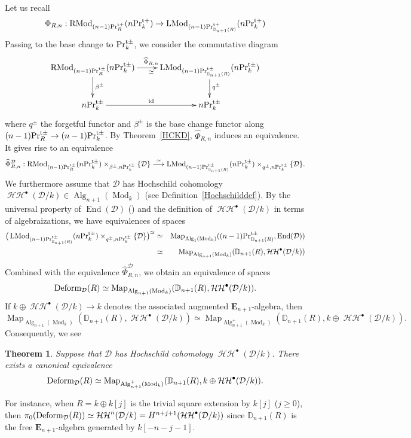 \documentclass[leqno,12pt]{amsart}
\theoremstyle{plain}
\newtheorem{Theorem}{Theorem}[section]
\theoremstyle{definition}
\newcommand{\DD}{\mathbb{D}}
\newcommand{\HH}{\operatorname{\mathcal{HH}}}
\newcommand{\DDD}{\mathcal{D}}
\newcommand{\PRTT}{\textup{Pr}^{\textup{t}+}}
\newcommand{\PRTTT}{\textup{Pr}^{\textup{t}\pm}}
\newcommand{\Mod}{\operatorname{Mod}}
\newcommand{\Map}{\operatorname{Map}}
\newcommand{\Fun}{\operatorname{Fun}}
\newcommand{\Alg}{\operatorname{Alg}}
\newcommand{\End}{\operatorname{End}}
\newcommand{\LMod}{\operatorname{LMod}}
\newcommand{\RMod}{\operatorname{RMod}}
\begin{document}
Let us recall
\[
\Phi_{R,n} :\RMod_{(n-1)\PRTT_R}(n\PRTT_k) \to  \LMod_{(n-1)\PRTT_{\DD_{n+1}(R)}}(n\PRTT_k) %
\]
Passing to the base change to $\PRTTT_k$,
we consider the commutative diagram 
\[
\xymatrix{
\RMod_{(n-1)\PRTTT_R}(n\PRTTT_k)  \ar[r]^{\widehat{\Phi}_{R,n}}_{\simeq} \ar[d]^{\beta^\pm} & \LMod_{(n-1)\PRTTT_{\DD_{n+1}(R)}}(n\PRTTT_k)   \ar[d]^{q^{\pm}} \\
n\PRTTT_k  \ar[r]^{\textup{id}}  & n\PRTTT_k
}
\]
where $q^\pm$ the forgetful functor and $\beta^\pm$ is the base change functor along 
$(n-1)\PRTTT_R \to (n-1)\PRTTT_k$.
By Theorem~\ref{HCKD}, $\widehat{\Phi}_{R,n}$ induces an equivalence.
It gives rise to an equivalence
\[
\widehat{\Phi}_{R,n}^{\DDD}:\RMod_{(n-1)\PRTTT_R}(n\PRTTT_k)\times_{\beta^{\pm},n\PRTTT_k}\{\DDD\}
\stackrel{\simeq}{\longrightarrow}  \LMod_{(n-1)\PRTTT_{\DD_{n+1}(R)}}(n\PRTTT_k) \times_{q^{\pm}, n\PRTTT_k}\{\DDD\}.
\]
We furthermore assume that $\DDD$ has Hochschild cohomology $\HH^\bullet(\DDD/k)\in \Alg_{n+1}(\Mod_k)$ (see Definition~\ref{Hochschilddef}).
By the universal property of $\End(\DDD)$ (\cite[6.1.2.40]{HA}) and the definition of $\HH^\bullet(\DDD/k)$ in terms of algebraizations,
we have equivalences of spaces
\begin{eqnarray*}
\big{(}\LMod_{(n-1)\PRTTT_{\DD_{n+1}(R)}}(n\PRTTT_k) \times_{q^\pm, n\PRTTT_k}\{\DDD\}\big{)}^{\simeq} &\simeq& \Map_{\Alg_1(\Mod_k)}((n-1)\PRTTT_{\DD_{n+1}(R)},\End(\DDD)) \\
&\simeq& \Map_{\Alg_{n+1}(\Mod_k)}(\DD_{n+1}(R),\HH^\bullet(\DDD/k))
\end{eqnarray*}
Combined with the equivalence $\widehat{\Phi}_{R,n}^{\DDD}$, we obtain an equivalence of spaces
\[
\textup{Deform}_{\DDD}(R)\simeq \Map_{\Alg_{n+1}(\Mod_k)}(\DD_{n+1}(R),\HH^\bullet(\DDD/k)).
\]
If $k\oplus \HH^\bullet(\DDD/k)\to k$ denotes the associated augmented $\mathbf{E}_{n+1}$-algebra,
then 
\[
\Map_{\Alg_{n+1}(\Mod_k)}(\DD_{n+1}(R),\HH^\bullet(\DDD/k))\simeq\Map_{\Alg_{n+1}^+(\Mod_k)}(\DD_{n+1}(R),k\oplus \HH^\bullet(\DDD/k)).
\]
Consequently, we see

\begin{Theorem}
\label{deformmain}
Suppose that $\DDD$ has Hochschild cohomology $\HH^\bullet(\DDD/k)$.
There exists a canonical equivalence 
\[
\textup{Deform}_{\DDD}(R)\simeq \Map_{\Alg_{n+1}^+(\Mod_k)}(\DD_{n+1}(R),k\oplus \HH^\bullet(\DDD/k)).
\]
\end{Theorem}


For instance, when $R=k\oplus k[j]$ is the trivial square extension by $k[j]$  ($j\ge0$), then
$\pi_0(\textup{Deform}_{\DDD}(R))\simeq \HH^{n}(\DDD/k)=H^{n+j+1}(\HH^\bullet(\DDD/k))$
since $\DD_{n+1}(R)$ is the free $\mathbf{E}_{n+1}$-algebra generated by $k[-n-j-1]$.
\end{document}
